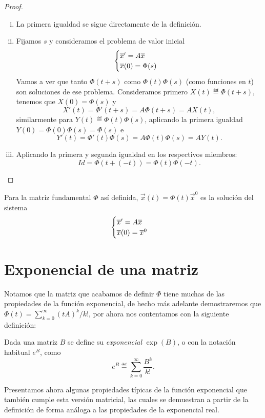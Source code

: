 \documentclass[../ecuaciones_diferenciales.tex]{subfiles}
\begin{document}
\begin{proof}
	\begin{enumerate}[i), wide, labelwidth=0pt, labelindent=0pt]
		\item La primera igualdad se sigue directamente de la definición.

		\item Fijamos \(s\) y consideramos el problema de valor inicial
			\[\begin{cases}\overline{x}' = A\overline{x} \\ \overline{x}(0) = \Phi(s) \end{cases}\]
		      Vamos a ver que tanto \(\Phi(t + s)\) como \(\Phi(t)\Phi(s)\) (como
		      funciones en \(t\)) son soluciones de ese problema. Consideramos
		      primero \(X(t) \eqdef \Phi(t + s)\), tenemos que \(X(0) = \Phi(s)\) y
		      \[X'(t) = \Phi'(t + s) = A \Phi(t + s) = A X(t),\]
		      similarmente para \(Y(t) \eqdef \Phi(t)\Phi(s)\), aplicando la primera
		      igualdad \(Y(0) = \Phi(0)\Phi(s) = \Phi(s)\) e
		      \[Y'(t) = \Phi'(t)\Phi(s) = A \Phi(t)\Phi(s) = A Y(t).\]

		\item Aplicando la primera y segunda igualdad en los respectivos
		      miembros:
		      \[\mathit{Id} = \Phi(t + (-t)) = \Phi(t)\Phi(-t).\]
	\end{enumerate}
\end{proof}

Para la matriz fundamental \(\Phi\) así definida, 
\(\vec{x}(t) = \Phi(t)\vec{x}^0\) es la solución del sistema
\[\begin{cases}\overline{x}' = A\overline{x} \\ \overline{x}(0) = \overline{x}^0\end{cases}\]

\section{Exponencial de una matriz}

Notamos que la matriz que acabamos de definir \(\Phi\) tiene muchas de las
propiedades de la función exponencial, de hecho más adelante demostraremos que
\(\Phi(t) = \sum_{k=0}^\infty (tA)^k/k!\), por ahora nos contentamos con la
siguiente definición:

\begin{definition}
	Dada una matriz \(B\) se define su \emph{exponencial} \(\exp(B)\), o con la
    notación habitual \(e^B\), como
	\[e^B \eqdef \sum_{k = 0}^\infty \frac{B^k}{k!}.\]
\end{definition}

Presentamos ahora algunas propiedades típicas de la función exponencial que
también cumple esta versión matricial, las cuales se demuestran a partir de la
definición de forma análoga a las propiedades de la exponencial real.
\end{document}
